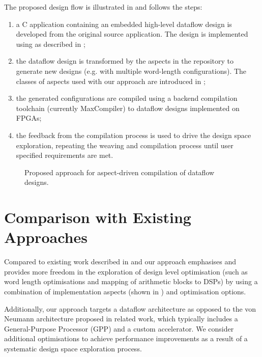 The proposed design flow is illustrated in 
and follows the steps:
\begin{enumerate}
\item a C application containing an embedded high-level dataflow
  design is developed from the original source application. The design
  is implemented using \FAST{} as described in ;
\item the dataflow design is transformed by the aspects in the
  repository to generate new designs (e.g. with multiple word-length
  configurations). The classes of aspects used with our approach are
  introduced in ;
\item the generated configurations are compiled using a backend
  compilation toolchain (currently MaxCompiler) to dataflow designs
  implemented on FPGAs;
\item the feedback from the compilation process is used to drive the
  design space exploration, repeating the weaving and compilation
  process until user specified requirements are met.
\end{enumerate}

\begin{figure}[!ht]
  \centering
  \def\svgwidth{45em}
  
  \caption{Proposed approach for aspect-driven compilation of dataflow
   designs.}
  \label{fig:design-flow}
\end{figure}

\section{Comparison with Existing Approaches}

Compared to existing work described in
\cite{Cardoso:Teixeira:Alves:Nobre:Diniz:Cutinho:Luk:2012} and
\cite{cardoso2011new} our approach emphasises and provides more
freedom in the exploration of design level optimisation (such as word
length optimisations and mapping of arithmetic blocks to DSPs) by
using a combination of implementation aspects (shown in
) and \FAST{} optimisation options.

Additionally, our approach targets a dataflow architecture as opposed
to the von Neumann architecture proposed in related work, which
typically includes a General-Purpose Processor (GPP) and a custom
accelerator. We consider additional optimisations to achieve
performance improvements as a result of a systematic design space
exploration process.

